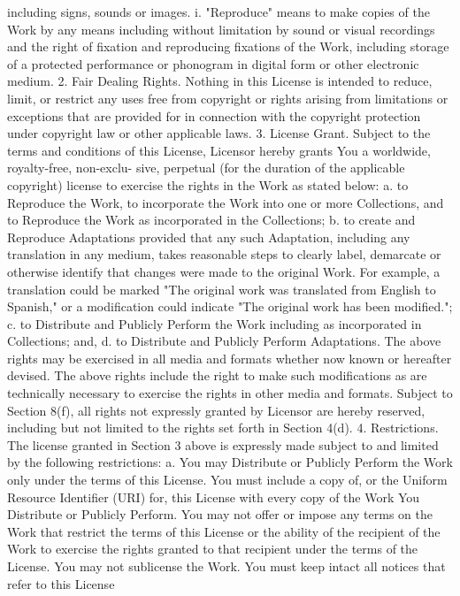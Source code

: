 \documentclass[oneside]{book}
\begin{document}
including signs, sounds or images.  i. "Reproduce" means to make copies of the
Work by any means including without limitation by sound or visual recordings and
the right of fixation and reproducing fixations of the Work, including storage
of a protected performance or phonogram in digital form or other electronic
medium.  2. Fair Dealing Rights.  Nothing in this License is intended to reduce,
limit, or restrict any uses free from copyright or rights arising from
limitations or exceptions that are provided for in connection with the copyright
protection under copyright law or other applicable laws.  3. License Grant.
Subject to the terms and conditions of this License, Licensor hereby grants You
a worldwide, royalty-free, non-exclu- sive, perpetual (for the duration of the
applicable copyright) license to exercise the rights in the Work as stated
below: a. to Reproduce the Work, to incorporate the Work into one or more
Collections, and to Reproduce the Work as incorporated in the Collections; b. to
create and Reproduce Adaptations provided that any such Adaptation, including
any translation in any medium, takes reasonable steps to clearly label,
demarcate or otherwise identify that changes were made to the original Work. For
example, a translation could be marked "The original work was translated from
English to Spanish," or a modification could indicate "The original work has
been modified."; c. to Distribute and Publicly Perform the Work including as
incorporated in Collections; and, d. to Distribute and Publicly Perform
Adaptations.  The above rights may be exercised in all media and formats whether
now known or hereafter devised. The above rights include the right to make such
modifications as are technically necessary to exercise the rights in other media
and formats. Subject to Section 8(f), all rights not expressly granted by
Licensor are hereby reserved, including but not limited to the rights set forth
in Section 4(d).  4. Restrictions.  The license granted in Section 3 above is
expressly made subject to and limited by the following restrictions: a. You may
Distribute or Publicly Perform the Work only under the terms of this
License. You must include a copy of, or the Uniform Resource Identifier (URI)
for, this License with every copy of the Work You Distribute or Publicly
Perform. You may not offer or impose any terms on the Work that restrict the
terms of this License or the ability of the recipient of the Work to exercise
the rights granted to that recipient under the terms of the License. You may not
sublicense the Work. You must keep intact all notices that refer to this License
\end{document}

